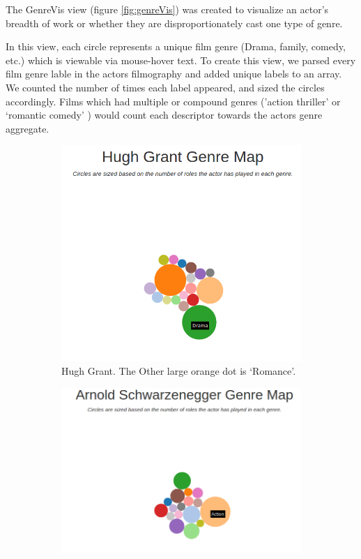 \documentclass[12pt]{article}
\begin{document}
	
The GenreVis view (figure \ref{fig:genreVis}) was created to visualize an actor's breadth of work or whether they are disproportionately cast one type of genre.  

In this view, each circle represents a unique film genre (Drama, family, comedy, etc.) which is viewable via mouse-hover text.  To create this view, we parsed every film genre lable in the actors filmography and added unique labels to an array.  We counted the number of times each label appeared, and sized the circles accordingly.  Films which had multiple or compound genres ('action thriller' or `romantic comedy' ) would count each descriptor towards the actors genre aggregate.


	\begin{figure}[h!]
		\centering
		\begin{subfigure}[t]{.5\textwidth}
		  \centering
		  \includegraphics[width=\linewidth]{images/HughGrantGenre.png}
		  \caption{ Hugh Grant.  The Other large orange dot is `Romance'.}
		  \label{fig:HughGrantGenre}
		\end{subfigure}%
		\begin{subfigure}[t]{.5\textwidth}
		  \centering
		  \includegraphics[width=\linewidth]{images/ArnoldGenreVis.png}

\end{subfigure}
\end{figure}
\end{document}
